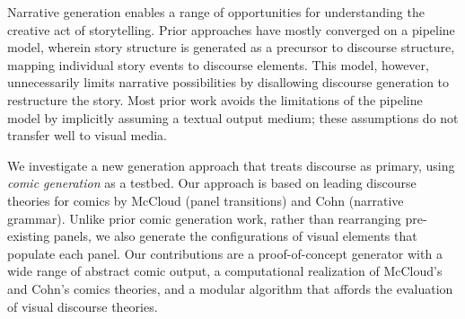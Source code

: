Narrative generation enables a range of opportunities for understanding 
the creative act of storytelling.
Prior approaches have mostly converged on a pipeline model, wherein story
structure is generated as a precursor to discourse structure, mapping
individual story events to discourse elements. 
This model, however, unnecessarily limits narrative possibilities by
disallowing discourse generation to restructure the story.
Most prior work avoids the limitations of the pipeline model by implicitly
assuming a textual output medium; these assumptions do not transfer well to
visual media.

We investigate a new generation approach that treats discourse as
primary, using {\em comic generation} as a testbed.  Our approach is based
on leading discourse theories for comics by McCloud (panel transitions) and
Cohn (narrative grammar).  Unlike prior comic generation work, rather than
rearranging pre-existing panels, we also generate the configurations of
visual elements that populate each panel. 
Our contributions are a proof-of-concept generator with a wide range of
abstract comic output, a computational realization of McCloud's and Cohn's
comics theories, and a modular algorithm that affords the evaluation of
visual discourse theories.


